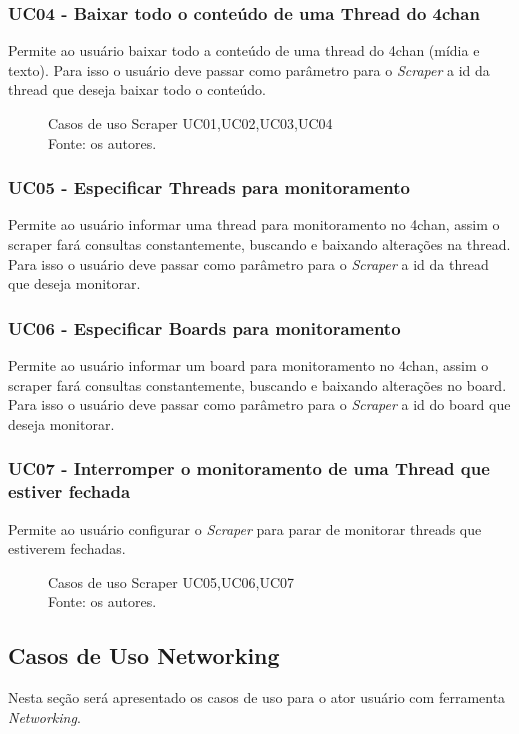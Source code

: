 \subsubsection{UC04 - Baixar todo o conteúdo de uma Thread do 4chan}
Permite ao usuário baixar todo a conteúdo de uma thread do 4chan (mídia e texto). Para isso o usuário deve passar como parâmetro para o \textit{Scraper} a id da thread que deseja baixar todo o conteúdo.
\begin{figure}[H]
    \centering
    
    \caption[Casos de uso Scraper UC01,UC02,UC03,UC04]{\label{fig:Ator_Scraper1}
        Casos de uso Scraper UC01,UC02,UC03,UC04\\
        Fonte: os autores.
    }
\end{figure}
\subsubsection{UC05 - Especificar Threads para monitoramento}
Permite ao usuário informar uma thread para monitoramento no 4chan, assim o scraper fará consultas constantemente, buscando e baixando alterações na thread. Para isso o usuário deve passar como parâmetro para o \textit{Scraper} a id da thread que deseja monitorar.  
\subsubsection{UC06 - Especificar Boards para monitoramento}
Permite ao usuário informar um board para monitoramento no 4chan, assim o scraper fará consultas constantemente, buscando e baixando alterações no board. Para isso o usuário deve passar como parâmetro para o \textit{Scraper} a id do board que deseja monitorar.  
\subsubsection{UC07 - Interromper o monitoramento de uma Thread que estiver fechada}
Permite ao usuário configurar o \textit{Scraper} para parar de monitorar threads que estiverem fechadas.
\begin{figure}[H]
    \centering
    
    \caption[Casos de uso Scraper UC05,UC06,UC07]{\label{fig:Ator_Scraper2}
        Casos de uso Scraper UC05,UC06,UC07\\
        Fonte: os autores.
    }
\end{figure}
\subsection{Casos de Uso Networking}
Nesta seção será apresentado os casos de uso para o ator usuário com ferramenta \textit{Networking}.
